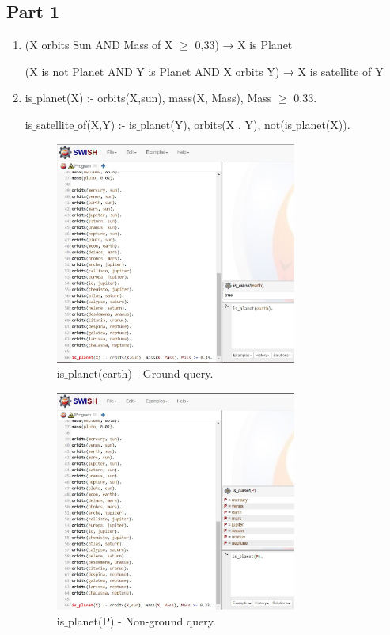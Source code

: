 \documentclass[12pt]{article}
\begin{document}
\subsection*{Part 1}
\begin{enumerate}
	
	\item (X orbits Sun AND Mass of X $\geq$ 0,33) → X is Planet
	
	(X is not Planet AND Y is Planet AND X orbits Y) → X is satellite of Y
	
	
	\item is$\_$planet(X) :- orbits(X,sun), mass(X, Mass), Mass $\geq$ 0.33. 
	
	is$\_$satellite$\_$of(X,Y) :- is$\_$planet(Y), orbits(X , Y), not(is$\_$planet(X)).
	
	\begin{figure}[htbp]
		\centering
		\includegraphics[width=0.75\textwidth]{is-planet_G.JPG}
		\caption{is$\_$planet(earth) - Ground query.}
	\end{figure}
	
	\begin{figure}[htbp]
		\centering
		\includegraphics[width=0.75\textwidth]{is-planet_NG.JPG}
		\caption{is$\_$planet(P) - Non-ground query.}
	\end{figure}
	

\end{enumerate}
\end{document}
